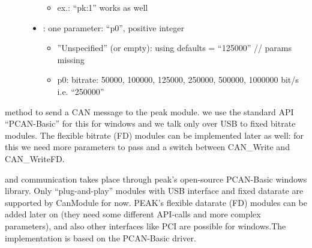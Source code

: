 \documentclass[letterpaper,10pt,english]{sphinxmanual}
\begin{document}
\begin{fulllineitems}
\begin{fulllineitems}
\begin{description}
\begin{itemize}
\begin{itemize}
\item {} 
ex.: “pk:1” works as well

\end{itemize}


\item {} 
: one parameter: “p0”, positive integer\begin{itemize}
\item {} 
”Unspecified” (or empty): using defaults = “125000” // params missing

\item {} 
p0: bitrate: 50000, 100000, 125000, 250000, 500000, 1000000 bit/s i.e. “250000”

\end{itemize}


\end{itemize}

\end{description}


\end{fulllineitems}


\begin{fulllineitems}
\label{\detokenize{vendors/peak:_CPPv4N9PKCanScan11sendMessageEshPhb}}%
\pysigstartmultiline
{}\label{\detokenize{vendors/peak:classPKCanScan_1a48a2e9ba00dae1b1fe01f7b095430503}}%
\pysigstopmultiline
method to send a CAN message to the peak module. we use the standard API “PCAN-Basic” for this for windows and we talk only over USB to fixed bitrate modules. The flexible bitrate (FD) modules can be implemented later as well: for this we need more parameters to pass and a switch between CAN\_Write and CAN\_WriteFD. 

\end{fulllineitems}


\end{fulllineitems}


and communication takes place through peak’s open-source PCAN-Basic windows library. Only “plug-and-play”
modules with USB interface and fixed datarate are supported by CanModule for now. PEAK’s flexible datarate (FD)
modules can be added later on (they need some different API-calls and more complex parameters), and also
other interfaces like PCI are possible for windows.The implementation is based on the PCAN-Basic driver.
\end{document}
